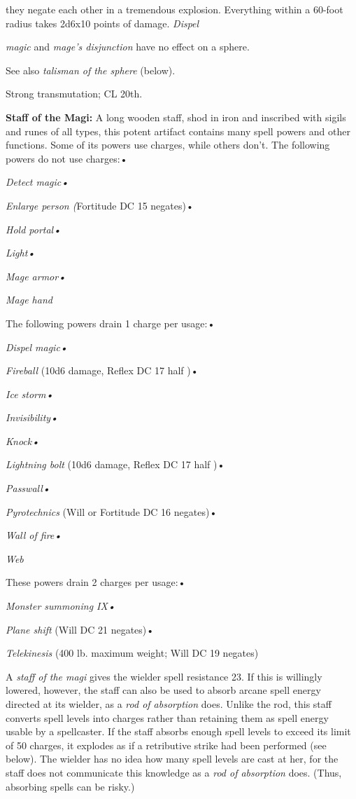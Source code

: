 they negate each other in a tremendous explosion. Everything within a 60-foot radius 
takes 2d6x10 points of damage. \textit{Dispel}

\textit{magic }and \textit{mage's disjunction }have no effect on a sphere.

See also \textit{talisman of the sphere }(below).

Strong transmutation; CL 20th.

\vspace{12pt}
\textbf{Staff of the Magi:} A long wooden staff, shod in iron and inscribed with 
sigils and runes of all types, this potent artifact contains many spell powers 
and other functions. Some of its powers use charges, while others don't. The following 
powers do not use charges:•

\textit{Detect magic•}

\textit{Enlarge person (}Fortitude DC 15 negates)•

\textit{Hold portal•}

\textit{Light•}

\textit{Mage armor•}

\textit{Mage hand}

The following powers drain 1 charge per usage:•

\textit{Dispel magic•}

\textit{Fireball }(10d6 damage, Reflex DC 17 half )•

\textit{Ice storm•}

\textit{Invisibility•}

\textit{Knock•}

\textit{Lightning bolt }(10d6 damage, Reflex DC 17 half )•

\textit{Passwall•}

\textit{Pyrotechnics }(Will or Fortitude DC 16 negates)•

\textit{Wall of fire•}

\textit{Web}

These powers drain 2 charges per usage:•

\textit{Monster summoning IX•}

\textit{Plane shift }(Will DC 21 negates)•

\textit{Telekinesis }(400 lb. maximum weight; Will DC 19 negates)

A \textit{staff of the magi }gives the wielder spell resistance 23. If this is 
willingly lowered, however, the staff can also be used to absorb arcane spell energy 
directed at its wielder, as a \textit{rod of absorption} does. Unlike the rod, 
this staff converts spell levels into charges rather than retaining them as spell 
energy usable by a spellcaster. If the staff absorbs enough spell levels to exceed 
its limit of 50 charges, it explodes as if a retributive strike had been performed 
(see below). The wielder has no idea how many spell levels are cast at her, for 
the staff does not communicate this knowledge as a \textit{rod of absorption }does. 
(Thus, absorbing spells can be risky.)

